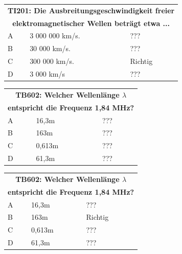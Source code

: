 \begin{frame}
	\begin{center}
	\begin{tabular}{|l|l|l|}
		\hline
		\multicolumn{3}{|c|}{\textbf{TI201: Die Ausbreitungsgeschwindigkeit freier}}\\
		\multicolumn{3}{|c|}{\textbf{elektromagnetischer Wellen beträgt etwa ...}}\\
		\hline
		A & 3 000 000 km/s. & ??? \\ \hline
		B & 30 000 km/s.    & ??? \\ \hline
		C & 300 000 km/s.   & Richtig \\ \hline
		D & 3 000 km/s      & ??? \\ \hline
	\end{tabular}
	\end{center}
\end{frame}

\begin{frame}
	\begin{center}
	\begin{tabular}{|l|l|l|}
		\hline
		\multicolumn{3}{|c|}{\textbf{TB602: Welcher Wellenlänge $\lambda$}}\\
		\multicolumn{3}{|c|}{\textbf{entspricht die Frequenz 1,84 MHz?}}\\
		\hline
		A & 16,3m   & ??? \\ \hline
		B & 163m    & ??? \\ \hline
		C & 0,613m  & ??? \\ \hline
		D & 61,3m   & ??? \\ \hline
	\end{tabular}
	\end{center}
\end{frame}

\begin{frame}
	\begin{center}
	\begin{tabular}{|l|l|l|}
		\hline
		\multicolumn{3}{|c|}{\textbf{TB602: Welcher Wellenlänge $\lambda$}}\\
		\multicolumn{3}{|c|}{\textbf{entspricht die Frequenz 1,84 MHz?}}\\
		\hline
		A & 16,3m   & ??? \\ \hline
		B & 163m    & Richtig \\ \hline
		C & 0,613m  & ??? \\ \hline
		D & 61,3m   & ??? \\ \hline
	\end{tabular}
	\end{center}
\end{frame}

